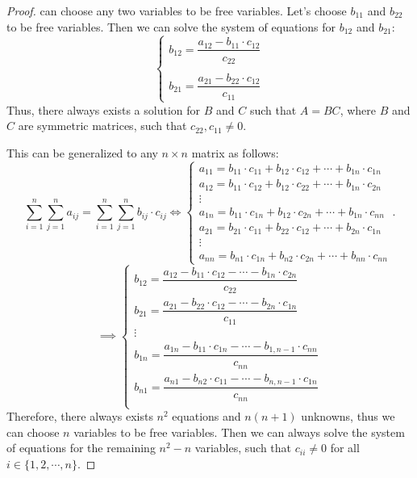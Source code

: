 \documentclass{zc-ust-hw}
\theoremstyle{definition}
\begin{document}
\begin{enumerate}
\begin{proof}
      can choose any two variables to be free variables. Let's choose $b_{11}$
      and $b_{22}$ to be free variables. Then we can solve the system of
      equations for $b_{12}$ and $b_{21}$:
      \begin{equation}
        \begin{cases}
          b_{12} = \dfrac{a_{12} - b_{11}\cdot c_{12}}{c_{22}} \\
          \\
          b_{21} = \dfrac{a_{21} - b_{22}\cdot c_{12}}{c_{11}}
        \end{cases}
      \end{equation}
      Thus, there always exists a solution for $B$ and $C$ such that $A=BC$, where
      $B$ and $C$ are symmetric matrices, such that $c_{22}, c_{11} \neq 0$.

      This can be generalized to any $n \times n$ matrix as follows:
      \begin{equation}
        \sum_{i=1}^{n} \sum_{j=1}^{n} a_{ij} = \sum_{i=1}^{n} \sum_{j=1}^{n} b_{ij} \cdot c_{ij}
        \iff
        \begin{cases}
          a_{11} = b_{11}\cdot c_{11} + b_{12}\cdot c_{12} + \cdots + b_{1n}\cdot c_{1n} \\
          a_{12} = b_{11}\cdot c_{12} + b_{12}\cdot c_{22} + \cdots + b_{1n}\cdot c_{2n} \\
          \vdots \\
          a_{1n} = b_{11}\cdot c_{1n} + b_{12}\cdot c_{2n} + \cdots + b_{1n}\cdot c_{nn} \\
          a_{21} = b_{21}\cdot c_{11} + b_{22}\cdot c_{12} + \cdots + b_{2n}\cdot c_{1n} \\
          \vdots \\
          a_{nn} = b_{n1}\cdot c_{1n} + b_{n2}\cdot c_{2n} + \cdots + b_{nn}\cdot c_{nn}
        \end{cases}
      .\end{equation}
      \begin{equation}
        \implies \begin{cases}
          b_{12} = \dfrac{a_{12} - b_{11}\cdot c_{12} - \cdots - b_{1n}\cdot c_{2n}}{c_{22}} \\
          b_{21} = \dfrac{a_{21} - b_{22}\cdot c_{12} - \cdots - b_{2n}\cdot c_{1n}}{c_{11}} \\
          \vdots \\
          b_{1n} = \dfrac{a_{1n} - b_{11}\cdot c_{1n} - \cdots - b_{1,n-1}\cdot c_{nn}}{c_{nn}} \\
          b_{n1} = \dfrac{a_{n1} - b_{n2}\cdot c_{11} - \cdots - b_{n,n-1}\cdot c_{1n}}{c_{nn}} \\
        \end{cases}
      \end{equation}
      Therefore, there always exists $n^2$ equations and $n(n+1)$ unknowns,
      thus we can choose $n$ variables to be free variables. Then we can always
      solve the system of equations for the remaining $n^2 - n$ variables, such
      that $c_{ii} \neq 0$ for all $i \in \{1, 2, \cdots, n\}$.
    \end{proof}


\end{enumerate}
\end{document}
